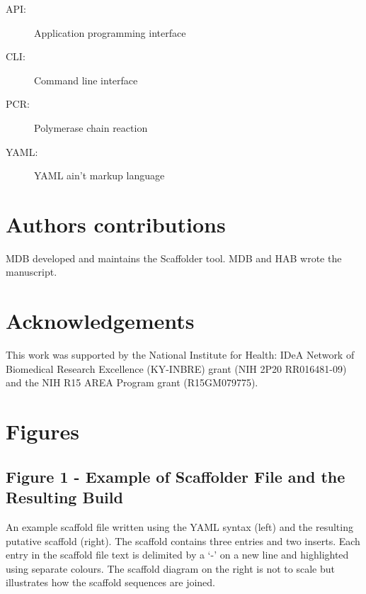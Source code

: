 \documentclass[10pt]{bmc_article}
\newenvironment{bmcformat}{\begin{raggedright}\baselineskip20pt\sloppy\setboolean{publ}{false}}{\end{raggedright}\baselineskip20pt\sloppy}
\begin{document}
\begin{bmcformat}
  \begin{description}
    \item[API:] Application programming interface
    \item[CLI:] Command line interface
    \item[PCR:] Polymerase chain reaction
    \item[YAML:] YAML ain't markup language\cite{yaml}
  \end{description}

\section*{Authors contributions} %

MDB developed and maintains the Scaffolder tool. MDB and HAB wrote the
manuscript.

\section*{Acknowledgements} %

This work was supported by the National Institute for Health: IDeA Network of
Biomedical Research Excellence (KY-INBRE) grant (NIH 2P20 RR016481-09) and the
NIH R15 AREA Program grant (R15GM079775).

\clearpage

{
   }     %


\clearpage

\section*{Figures} %

\subsection*{Figure 1 - Example of Scaffolder File and the Resulting Build}

An example scaffold file written using the YAML syntax \cite{yaml} (left) and
the resulting putative scaffold (right). The scaffold contains three entries
and two inserts. Each entry in the scaffold file text is delimited by a `-' on
a new line and highlighted using separate colours. The scaffold diagram on the
right is not to scale but illustrates how the scaffold sequences are joined.
\pb

\end{bmcformat}
\end{document}
